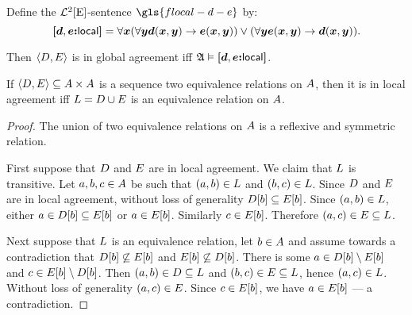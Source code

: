 \begin{definition}
Define the $\mathcal{L}^{2}[\mathrm{E}]$-sentence $\gls{flocal-d-e}$ by:
\[
{\bm{[}\bm{d},\bm{e}\mathord{\bm{:}}\mathsf{local}\bm{]}} =
    \forall \bm{x} 
    (\forall \bm{y} \bm{d}(\bm{x},\bm{y}) \rightarrow \bm{e}(\bm{x},\bm{y}))
    \lor 
    (\forall \bm{y} \bm{e}(\bm{x},\bm{y}) \rightarrow \bm{d}(\bm{x},\bm{y})).
\]
\end{definition}
Then $\left\langle D, E \right\rangle$ is in global agreement iff
$\mathfrak{A} \vDash {\bm{[}\bm{d},\bm{e}\mathord{\bm{:}}\mathsf{local}\bm{]}}$.

\begin{lemma}\label{lem:local-2}
If $\left\langle D, E \right\rangle \subseteq {A\times A}$ is a sequence two
equivalence relations on $A$, then
it is in local agreement iff $L = D \cup E$ is an equivalence
relation on $A$.
\end{lemma}
\begin{proof}
The union of two equivalence relations on $A$ is a reflexive and symmetric
relation.

First suppose that $D$ and $E$ are in local agreement.
We claim that $L$ is transitive.
Let $a, b, c \in A$ be such that $(a, b) \in L$ and 
$(b, c) \in L$.
Since $D$ and $E$ are in local agreement,
without loss of generality $D[b] \subseteq E[b]$.
Since $(a, b) \in L$, either $a \in D[b] \subseteq E[b]$
or $a \in E[b]$.
Similarly $c \in E[b]$.
Therefore $(a, c) \in E \subseteq L$.
    
Next suppose that $L$ is an equivalence relation, let $b \in A$ and
assume towards a contradiction
that $D[b] \not\subseteq E[b]$ and $E[b] \not\subseteq
D[b]$.
There is some $a \in D[b] \setminus E[b]$ and $c \in E[b]
\setminus D[b]$.
Then $(a, b) \in D \subseteq L$ and $(b, c) \in E \subseteq
L$, hence $(a, c) \in L$.
Without loss of generality $(a, c) \in E$.
Since $c \in E[b]$, we have $a \in E[b]$ --- a contradiction.
\end{proof}